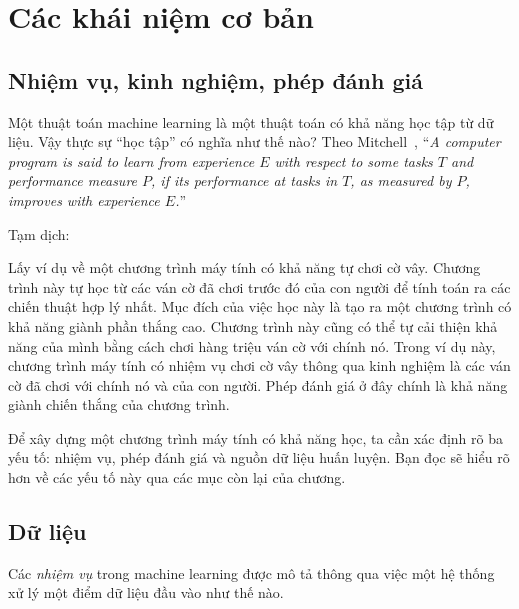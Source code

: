 
\chapter{Các khái niệm cơ bản}


\section{Nhiệm vụ, kinh nghiệm, phép đánh giá}
Một thuật toán machine learning là một thuật toán có khả năng {học tập} từ dữ
liệu. Vậy thực sự ``học tập'' có nghĩa như thế nào? Theo
Mitchell~\cite{mitchell1997machine}, ``\textit{A computer program is said to learn from
\textit{experience} $E$ with respect to some \textit{tasks} $T$ and
\textit{performance measure} $P$, if its performance at tasks in $T$, as
measured by $P$, improves with experience $E$.}''

Tạm dịch:


Lấy ví dụ về một chương trình máy tính có khả năng tự chơi cờ vây. Chương trình này tự học từ các ván cờ đã chơi trước đó của con người để tính toán ra các chiến thuật hợp lý nhất. Mục đích của việc học này là tạo ra một chương trình có khả năng giành phần thắng cao. Chương trình này cũng có thể tự cải thiện khả năng của mình bằng cách chơi hàng triệu ván cờ với chính nó. Trong ví dụ này, chương trình máy tính có nhiệm vụ chơi cờ vây thông qua kinh nghiệm là {các ván cờ đã chơi} với chính nó và của con người. Phép đánh giá ở đây chính là khả năng giành chiến thắng của chương trình.

Để xây dựng một chương trình máy tính có khả năng học, ta cần xác định rõ ba yếu tố: nhiệm vụ, phép đánh giá và nguồn dữ liệu huấn luyện. Bạn đọc sẽ hiểu rõ hơn về các yếu tố này qua các mục còn lại của chương.

\section{Dữ liệu}
Các \textit{nhiệm vụ} trong machine learning được mô tả thông qua việc
một hệ thống xử lý một điểm dữ liệu đầu vào như thế nào.


